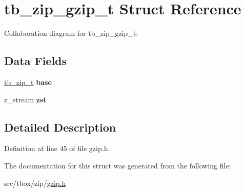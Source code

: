 \hypertarget{structtb__zip__gzip__t}{\section{tb\-\_\-zip\-\_\-gzip\-\_\-t Struct Reference}
\label{structtb__zip__gzip__t}
}


Collaboration diagram for tb\-\_\-zip\-\_\-gzip\-\_\-t\-:
\subsection*{Data Fields}
\begin{DoxyCompactItemize}
\item 
\hypertarget{structtb__zip__gzip__t_ab00377e24ff8b38cb672986365613baa}{\hyperlink{structtb__zip__t}{tb\-\_\-zip\-\_\-t} {\bfseries base}}\label{structtb__zip__gzip__t_ab00377e24ff8b38cb672986365613baa}

\item 
\hypertarget{structtb__zip__gzip__t_abdddf3ca1e1738d90d3fdb4d4a7e4139}{z\-\_\-stream {\bfseries zst}}\label{structtb__zip__gzip__t_abdddf3ca1e1738d90d3fdb4d4a7e4139}

\end{DoxyCompactItemize}


\subsection{Detailed Description}


Definition at line 45 of file gzip.\-h.



The documentation for this struct was generated from the following file\-:\begin{DoxyCompactItemize}
\item 
src/tbox/zip/\hyperlink{gzip_8h}{gzip.\-h}\end{DoxyCompactItemize}
